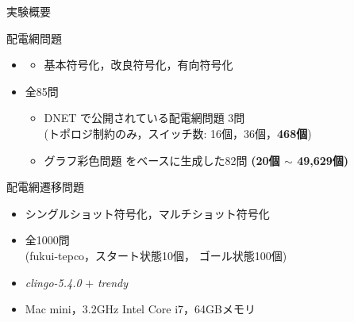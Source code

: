 \documentclass[dvipdfmx,11pt]{beamer}
\begin{document}
\begin{frame}{実験概要}
  \renewcommand{\thefootnote}{\fnsymbol{footnote}}
  \setcounter{footnote}{1}
 \small
 \begin{block}{配電網問題}
  \begin{itemize}
   \setlength{\parskip}{0cm} %
   \setlength{\itemsep}{0cm} %
   \item {}
   \begin{itemize}
    \item 基本符号化，改良符号化，有向符号化
   \end{itemize}
   \item {} 全85問
         \begin{itemize}
          \item DNET \footnotemark%
                で公開されている配電網問題 3問 \\(トポロジ制約のみ，スイッチ数: 16個，36個，\alert{\bf 468個})
          \item グラフ彩色問題 \footnotemark%
                をベースに生成した82問 \alert{\bf (20個 $\sim$ 49,629個)}
         \end{itemize}  
  \end{itemize}
 \end{block}
 \setcounter{footnote}{2}
 \setcounter{footnote}{3}
 \vfill
 \begin{block}{配電網遷移問題}
  \begin{itemize}
   \setlength{\parskip}{0cm} %
   \setlength{\itemsep}{0cm} %
   \item {} シングルショット符号化，マルチショット符号化
   \item {} 全1000問 \\
         (\textsf{fukui-tepco}，スタート状態10個，
         ゴール状態100個)
  \end{itemize}
 \end{block}
  \vfill
 \begin{exampleblock}{}
  \begin{itemize}
   \setlength{\parskip}{0cm} %
   \setlength{\itemsep}{0cm} %
   \item {} \textit{clingo-5.4.0} $+$ \textit{trendy}
   \item {} Mac mini，3.2GHz Intel Core i7，64GBメモリ
  \end{itemize}
 \end{exampleblock}
\end{frame}
\end{document}
